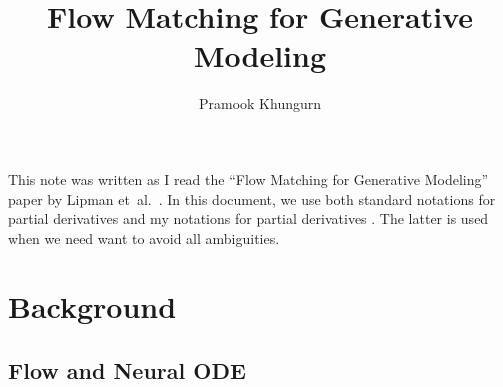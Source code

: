 \documentclass[10pt]{article}
\title{Flow Matching for Generative Modeling}
\author{Pramook Khungurn}
\newcommand{\etal}{{et~al.}}
\begin{document}
\maketitle

This note was written as I read the ``Flow Matching for Generative Modeling'' paper by Lipman \etal~\cite{Lipman:2023}. In this document, we use both standard notations for partial derivatives and my notations for partial derivatives \cite{Khungurn:Notation}. The latter is used when we need want to avoid all ambiguities.


\section{Background}

\subsection{Flow and Neural ODE}
\end{document}
